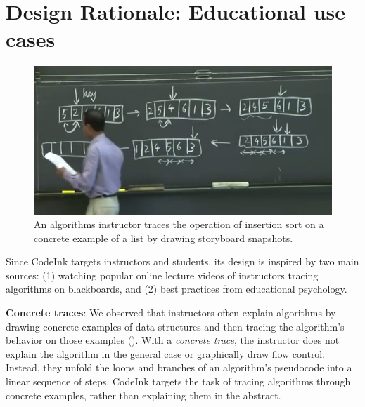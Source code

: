 \section{Design Rationale: Educational use cases}


\begin{figure}
\begin{center}
\includegraphics[width=0.7\columnwidth]{img/6006/insertion.png}
\end{center}

\caption{An algorithms instructor traces the operation of insertion sort 
on a concrete example of a list by drawing storyboard snapshots.}

\label{fig:6006-insertion}
\end{figure}


Since CodeInk targets instructors and students, its design is inspired
by two main sources: (1) watching popular online lecture videos of
instructors tracing algorithms on blackboards, and (2) best practices
from educational psychology.

\noindent \textbf{Concrete traces}:
We observed that instructors often explain algorithms by drawing concrete examples of
data structures and then tracing the algorithm's behavior on those
examples (). With a \emph{concrete trace}, the instructor does not
explain the algorithm in the general case or graphically draw flow control.
Instead, they unfold the loops and branches of an algorithm's pseudocode
into a linear sequence of steps.
CodeInk targets the task of tracing algorithms through concrete examples, rather
than explaining them in the abstract.


